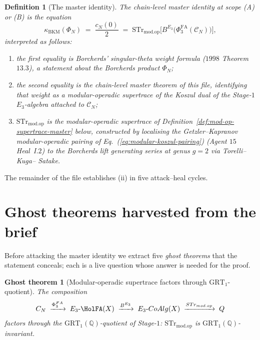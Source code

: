 \documentclass[11pt]{amsart}
\newtheorem{definition}[theorem]{Definition}
\newtheorem{ghost}[theorem]{Ghost theorem}
\providecommand{\Q}{\mathbb{Q}}
\providecommand{\cC}{\mathcal{C}}
\providecommand{\GRT}{\mathrm{GRT}}
\providecommand{\PhiFA}{\Phi^{\mathrm{FA}}}
\providecommand{\STr}{\mathrm{STr}}
\providecommand{\modop}{\mathrm{mod.op}}
\providecommand{\kBKM}{\kappa_{\mathrm{BKM}}}
\begin{document}
\begin{definition}[The master identity]
\label{def:master-identity}
The \emph{chain-level master identity} at scope (A) or (B) is the
equation
\begin{equation}
\label{eq:master-chain-level}
 \kBKM(\Phi_N) \;=\; \frac{c_N(0)}{2} \;=\;
 \STr_{\modop}\bigl[B^{E_3}\bigl(\PhiFA_3(\cC_N)\bigr)\bigr],
\end{equation}
interpreted as follows:
\begin{enumerate}[label=\textup{(\roman*)}]
\item the first equality is Borcherds' singular-theta weight formula
($1998$ Theorem~$13.3$), a statement about the Borcherds product
$\Phi_N$;
\item the second equality is the chain-level master theorem of this
file, identifying that weight as a modular-operadic supertrace of the
Koszul dual of the Stage-$1$ $E_3$-algebra attached to $\cC_N$;
\item $\STr_{\modop}$ is the modular-operadic supertrace of
Definition~\ref{def:mod-op-supertrace-master} below, constructed by
localising the Getzler--Kapranov modular-operadic pairing of
Eq.~(\ref{eq:modular-koszul-pairing}) (Agent $15$ Heal~I.$2$) to the
Borcherds lift generating series at genus $g = 2$ via Torelli--Kuga--
Satake.
\end{enumerate}
\end{definition}

The remainder of the file establishes (ii) in five attack--heal
cycles.

\section{Ghost theorems harvested from the brief}
\label{sec:ghosts}

Before attacking the master identity we extract five \emph{ghost
theorems} that the statement conceals; each is a live question whose
answer is needed for the proof.

\begin{ghost}[Modular-operadic supertrace factors through
$\GRT_1$-quotient]
\label{ghost:grt1-factoring}
The composition
\[
 \cC_N \;\xrightarrow{\PhiFA_3}\; E_3\text{-}\HolFA(X)
 \;\xrightarrow{B^{E_3}}\; E_3\text{-}\mathrm{CoAlg}(X)
 \;\xrightarrow{\STr_{\modop}}\; \Q
\]
factors through the $\GRT_1(\Q)$-quotient of Stage-$1$:
$\STr_{\modop}$ is $\GRT_1(\Q)$-invariant.
\end{ghost}
\end{document}
